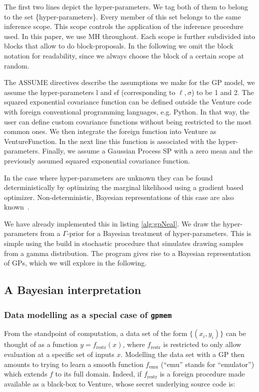 \documentclass{article} %
\newcommand{\gpmem}{\texttt{gpmem}}
\newcommand{\emu}{{\textrm{emu}}}
\newcommand{\restr}{{\textrm{restr}}}
\begin{document}
The first two lines depict the hyper-parameters. We tag both of them to belong to the set \{hyper-parameters\}. Every member of this set belongs to the same inference scope. This scope controls the application of the inference procedure used. In this paper, we use MH throughout. Each scope is further subdivided into blocks that allow to do block-proposals. In the following we omit the block notation for readability, since we always choose the block of a certain scope at random.

The ASSUME directives describe the assumptions we make for the GP model, we assume the hyper-parameters l and sf (corresponding to $\ell,\sigma$) to be 1 and 2. The squared exponential covariance function can be defined outside the Venture code with foreign conventional programming languages, e.g. Python. In that way, the user can define custom covariance functions without being restricted to the most common ones. We then integrate the foreign function into Venture as VentureFunction. In the next line this function is associated with the hyper-parameters. Finally, we assume a Gaussian Process SP with a zero mean and the previously assumed squared exponential covariance function.





In the case where hyper-parameters are unknown they can be found deterministically by optimizing the marginal likelihood using a gradient based optimizer. Non-deterministic, Bayesian representations of this case are also known~\citep{neal1997monte}. 

We have already implemented this in listing \ref{alg:gpNeal}. We draw the hyper-parameters from a $\Gamma$-prior for a Bayesian treatment of hyper-parameters. This is simple using the build in stochastic procedure that simulates drawing samples from a gamma distribution.
The program gives rise to a Bayesian representation of GPs, which we will explore in the following.

\subsection{A Bayesian interpretation}


\subsubsection{Data modelling as a special case of \gpmem}\label{sec:special-case-gpmem}
From the standpoint of computation, a data set of the form $\{(x_i, y_i)\}$ can be thought of as a function $y = f_\restr(x)$, where $f_\restr$ is restricted to only allow evaluation at a specific set of inputs $x$.
Modelling the data set with a GP then amounts to trying to learn a smooth function $f_\emu$ (``emu'' stands for ``emulator'') which extends $f$ to its full domain.
Indeed, if $f_\restr$ is a foreign procedure made available as a black-box to Venture, whose secret underlying source code is:
\end{document}
